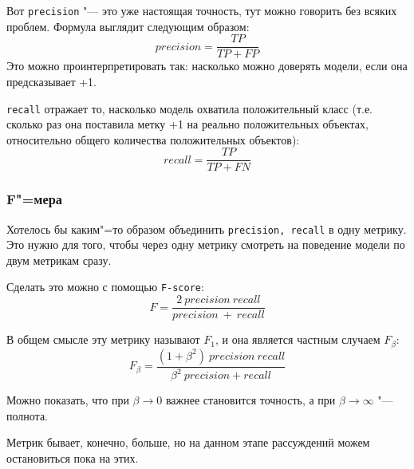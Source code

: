 Вот \texttt{precision} "--- это уже настоящая точность, тут можно говорить без всяких проблем. Формула выглядит следующим образом:
\[
precision = \frac{TP}{TP + FP}
\]
Это можно проинтерпретировать так: насколько можно доверять модели, если она предсказывает +1.

\texttt{recall} отражает то, насколько модель охватила положительный класс (т.е. сколько раз она поставила метку +1 на реально положительных объектах, относительно общего количества положительных объектов):
\[
recall = \frac{TP}{TP + FN}
\]

\subsubsection*{F"=мера}

Хотелось бы каким"=то образом объединить \texttt{precision, recall} в одну метрику. Это нужно для того, чтобы через одну метрику смотреть на поведение модели по двум метрикам сразу.

Сделать это можно с помощью \texttt{F-score}:
\[
F = \frac{2~precision~recall}{precision~+~recall}
\]

В общем смысле эту метрику называют $F_1$, и она является частным случаем $F_\beta$:
\[
F_\beta = \frac{(1 + \beta^2)~precision~recall}{\beta^2~precision + recall}
\]

Можно показать, что при $\beta \rightarrow 0$ важнее становится точность, а при $\beta \rightarrow \infty$ "--- полнота.

Метрик бывает, конечно, больше, но на данном этапе рассуждений можем остановиться пока на этих.